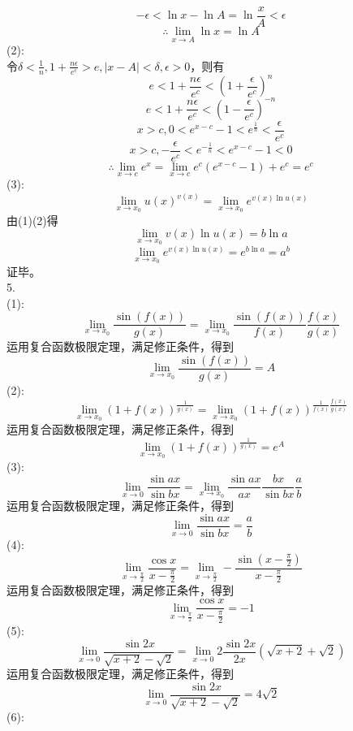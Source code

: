 \documentclass{ctexart}
\begin{document}
\[-\epsilon<\ln x-\ln A=\ln\frac{x}{A}<\epsilon\]
\[\therefore\lim\limits_{x\rightarrow A}\ln x=\ln A\]
(2):\\
令$\delta<\frac{1}{n},1+\frac{n\epsilon}{e^c}>e,|x-A|<\delta,\epsilon>0$，则有
\[e<1+\frac{n\epsilon}{e^c}<(1+\frac{\epsilon}{e^c})^n\]
\[e<1+\frac{n\epsilon}{e^c}<(1-\frac{\epsilon}{e^c})^{-n}\]
\[x>c,0<e^{x-c}-1<e^{\frac{1}{n}}<\frac{\epsilon}{e^c}\]
\[x>c,-\frac{\epsilon}{e^c}<e^{-\frac{1}{n}}<e^{x-c}-1<0\]
\[\therefore\lim\limits_{x\rightarrow c}e^x=\lim\limits_{x\rightarrow c}e^c(e^{x-c}-1)+e^c=e^c\]
(3):\\
\[\lim\limits_{x\rightarrow x_0}u(x)^{v(x)}=\lim\limits_{x\rightarrow x_0}e^{v(x)\ln u(x)}\]
由(1)(2)得
\[\lim\limits_{x\rightarrow x_0}v(x)\ln u(x)=b\ln a\]
\[\lim\limits_{x\rightarrow x_0}e^{v(x)\ln u(x)}=e^{b\ln a}=a^b\]
证毕。\\
5.\\
(1):\\
\[\lim\limits_{x\rightarrow x_0}\frac{\sin(f(x))}{g(x)}=\lim\limits_{x\rightarrow x_0}\frac{\sin(f(x))}{f(x)}\frac{f(x)}{g(x)}\]
运用复合函数极限定理，满足修正条件\uppercase\expandafter{}，得到
\[\lim\limits_{x\rightarrow x_0}\frac{\sin(f(x))}{g(x)}=A\]
(2):\\
\[\lim\limits_{x\rightarrow x_0}(1+f(x))^{\frac{1}{g(x)}}=\lim\limits_{x\rightarrow x_0}(1+f(x))^{\frac{1}{f(x)}\frac{f(x)}{g(x)}}\]
运用复合函数极限定理，满足修正条件\uppercase\expandafter{}，得到
\[\lim\limits_{x\rightarrow x_0}(1+f(x))^{\frac{1}{g(x)}}=e^A\]
(3):\\
\[\lim\limits_{x\rightarrow 0}\frac{\sin ax}{\sin bx}=\lim\limits_{x\rightarrow x_0}\frac{\sin ax}{ax}\frac{bx}{\sin bx}\frac{a}{b}\]
运用复合函数极限定理，满足修正条件\uppercase\expandafter{}，得到
\[\lim\limits_{x\rightarrow 0}\frac{\sin ax}{\sin bx}=\frac{a}{b}\]
(4):\\
\[\lim\limits_{x\rightarrow \frac{\pi}{2}}\frac{\cos x}{x-\frac{\pi}{2}}=\lim\limits_{x\rightarrow \frac{\pi}{2}}-\frac{\sin (x-\frac{\pi}{2})}{x-\frac{\pi}{2}}\]
运用复合函数极限定理，满足修正条件\uppercase\expandafter{}，得到
\[\lim\limits_{x\rightarrow \frac{\pi}{2}}\frac{\cos x}{x-\frac{\pi}{2}}=-1\]
(5):\\
\[\lim\limits_{x\rightarrow 0}\frac{\sin 2x}{\sqrt{x+2}-\sqrt{2}}=\lim\limits_{x\rightarrow 0}2\frac{\sin 2x}{2x}(\sqrt{x+2}+\sqrt{2})\]
运用复合函数极限定理，满足修正条件\uppercase\expandafter{}，得到
\[\lim\limits_{x\rightarrow 0}\frac{\sin 2x}{\sqrt{x+2}-\sqrt{2}}=4\sqrt{2}\]
(6):\\
\end{document}
